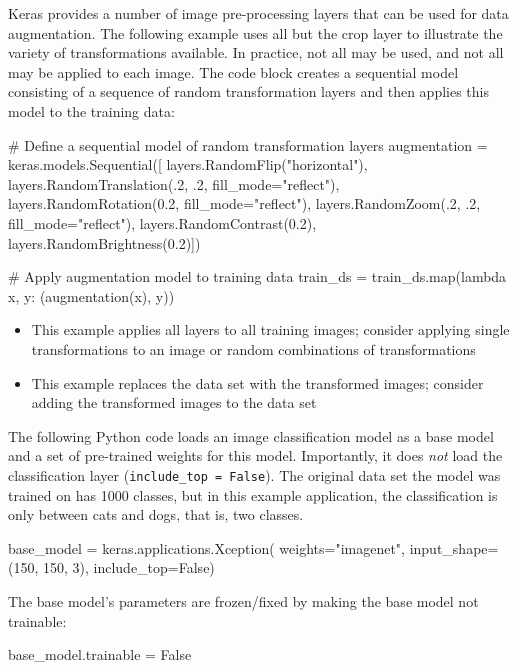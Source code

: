 Keras provides a number of image pre-processing layers that can be used for data augmentation. The following example uses all but the crop layer to illustrate the variety of transformations available. In practice, not all may be used, and not all may be applied to each image. The code block creates a sequential model consisting of a sequence of random transformation layers and then applies this model to the training data:

\begin{pythoncode}
# Define a sequential model of random transformation layers
augmentation = keras.models.Sequential([
    layers.RandomFlip("horizontal"),
    layers.RandomTranslation(.2, .2, fill_mode="reflect"),
    layers.RandomRotation(0.2, fill_mode="reflect"),
    layers.RandomZoom(.2, .2, fill_mode="reflect"),
    layers.RandomContrast(0.2),
    layers.RandomBrightness(0.2)])

# Apply augmentation model to training data
train_ds = train_ds.map(lambda x, y: (augmentation(x), y))
\end{pythoncode}

\begin{infobox}
\begin{itemize}
   \item This example applies all layers to all training images; consider applying single transformations to an image or random combinations of transformations
   \item This example replaces the data set with the transformed images; consider adding the transformed images to the data set
\end{itemize}
\end{infobox}

The following Python code loads an image classification model as a base model and a set of pre-trained weights for this model. Importantly, it does \emph{not} load the classification layer (\small\texttt{include\_top = False}\normalsize). The original data set the model was trained on has 1000 classes, but in this example application, the classification is only between cats and dogs, that is, two classes.
 
\begin{pythoncode}
base_model = keras.applications.Xception(
    weights="imagenet",
    input_shape=(150, 150, 3),
    include_top=False)
\end{pythoncode}

The base model's parameters are frozen/fixed by making the base model not trainable:
\begin{pythoncode}
base_model.trainable = False
\end{pythoncode}

